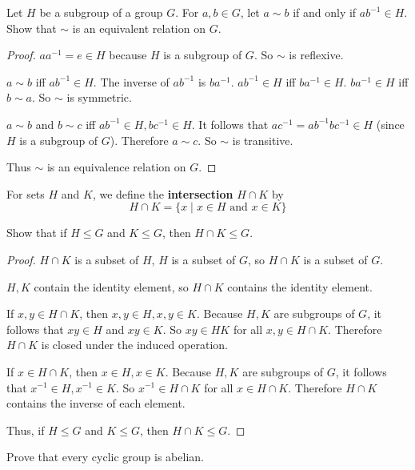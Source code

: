 \newpage
\begin{exercise}
    Let $H$ be a subgroup of a group $G$. For $a, b\in G$, let $a\sim b$ if and only if $ab^{-1}\in H$. Show that $\sim$ is an equivalent relation on $G$.
\end{exercise}

\begin{proof}
    $aa^{-1} = e \in H$ because $H$ is a subgroup of $G$. So $\sim$ is reflexive.

    $a\sim b$ iff $ab^{-1}\in H$. The inverse of $ab^{-1}$ is $ba^{-1}$. $ab^{-1}\in H$ iff $ba^{-1}\in H$. $ba^{-1}\in H$ iff $b\sim a$. So $\sim$ is symmetric.

    $a\sim b$ and $b\sim c$ iff $ab^{-1}\in H, bc^{-1}\in H$. It follows that $ac^{-1} = ab^{-1}bc^{-1} \in H$ (since $H$ is a subgroup of $G$). Therefore $a\sim c$. So $\sim$ is transitive.

    Thus $\sim$ is an equivalence relation on $G$.
\end{proof}

\newpage
\begin{exercise}
    For sets $H$ and $K$, we define the \textbf{intersection} $H\cap K$ by
    \[
        H\cap K = \{ x \mid x\in H \text{ and } x\in K \}
    \]

    Show that if $H\leq G$ and $K\leq G$, then $H\cap K\leq G$.
\end{exercise}

\begin{proof}
    $H\cap K$ is a subset of $H$, $H$ is a subset of $G$, so $H\cap K$ is a subset of $G$.

    $H, K$ contain the identity element, so $H\cap K$ contains the identity element.

    If $x, y\in H\cap K$, then $x, y\in H, x, y\in K$. Because $H, K$ are subgroups of $G$, it follows that $xy\in H$ and $xy\in K$. So $xy\in HK$ for all $x, y\in H\cap K$. Therefore $H\cap K$ is closed under the induced operation.

    If $x\in H\cap K$, then $x\in H, x\in K$. Because $H, K$ are subgroups of $G$, it follows that $x^{-1}\in H, x^{-1}\in K$. So $x^{-1}\in H\cap K$ for all $x\in H\cap K$. Therefore $H\cap K$ contains the inverse of each element.

    Thus, if $H\leq G$ and $K\leq G$, then $H\cap K \leq G$.
\end{proof}

\newpage
\begin{exercise}
    Prove that every cyclic group is abelian.
\end{exercise}

